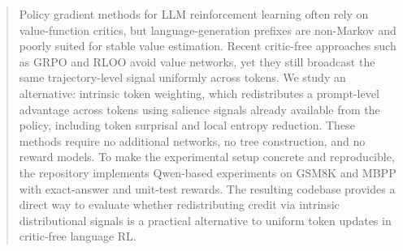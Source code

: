 \maketitle

\begin{abstract}\noindent
Policy gradient methods for LLM reinforcement learning often rely on value-function critics, but language-generation prefixes are non-Markov and poorly suited for stable value estimation. Recent critic-free approaches such as GRPO and RLOO avoid value networks, yet they still broadcast the same trajectory-level signal uniformly across tokens. We study an alternative: intrinsic token weighting, which redistributes a prompt-level advantage across tokens using salience signals already available from the policy, including token surprisal and local entropy reduction. These methods require no additional networks, no tree construction, and no reward models. To make the experimental setup concrete and reproducible, the repository implements Qwen-based experiments on GSM8K and MBPP with exact-answer and unit-test rewards. The resulting codebase provides a direct way to evaluate whether redistributing credit via intrinsic distributional signals is a practical alternative to uniform token updates in critic-free language RL.
\end{abstract}
